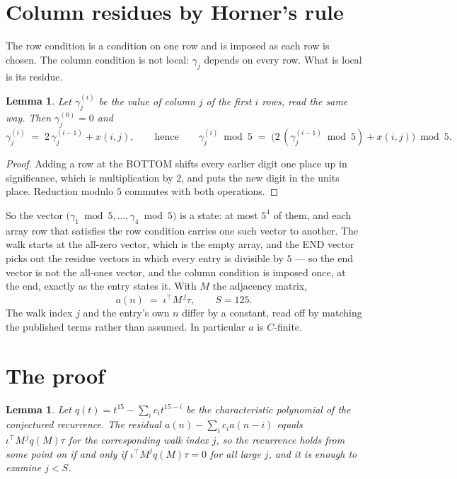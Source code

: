 \documentclass[11pt,a4paper]{article}
\theoremstyle{plain}
\newtheorem{lemma}[theorem]{Lemma}
\theoremstyle{definition}
\begin{document}
\section{Column residues by Horner's rule}

The row condition is a condition on one row and is imposed as each row is chosen. The column
condition is not local: $\gamma_j$ depends on every row. What is local is its residue.

\begin{lemma}\label{lem:horner}
Let $\gamma_j^{(i)}$ be the value of column $j$ of the first $i$ rows, read the same way.
Then $\gamma_j^{(0)}=0$ and
\[
\gamma_j^{(i)}\;=\;2\,\gamma_j^{(i-1)}+x(i,j),
\qquad\text{hence}\qquad
\gamma_j^{(i)}\bmod 5\;=\;
\bigl(2\,(\gamma_j^{(i-1)}\bmod 5)+x(i,j)\bigr)\bmod 5 .
\]
\end{lemma}

\begin{proof}
Adding a row at the BOTTOM shifts every earlier digit one place up in significance, which is
multiplication by $2$, and puts the new digit in the units place. Reduction modulo
$5$ commutes with both operations.
\end{proof}

So the vector $\bigl(\gamma_1\bmod 5,\dots,\gamma_{4}\bmod
5\bigr)$ is a state: at most $5^{4}$ of them, and each array row
that satisfies the row condition carries one such vector to another. The walk starts at the
all-zero vector, which is the empty array, and the END vector picks out the residue vectors in
which every entry is divisible by $5$ --- so the end vector is not the all-ones
vector, and the column condition is imposed once, at the end, exactly as the entry states it.
With $M$ the adjacency matrix,
\[
a(n)\;=\;\iota^{\!\top}M^{\,j}\tau ,\qquad S=125.
\]
The walk index $j$ and the entry's own $n$ differ by a constant, read off by matching the
published terms rather than assumed. In particular $a$ is $C$-finite.

\section{The proof}

\begin{lemma}\label{lem:crit}
Let $q(t)=t^{15}-\sum_i c_it^{15-i}$ be the characteristic polynomial of the
conjectured recurrence. The residual $a(n)-\sum_ic_ia(n-i)$ equals
$\iota^{\!\top}M^{\,j}q(M)\tau$ for the corresponding walk index $j$, so the recurrence
holds from some point on if and only if $\iota^{\!\top}M^{j}q(M)\tau=0$ for all large $j$,
and it is enough to examine $j<S$.
\end{lemma}
\end{document}
